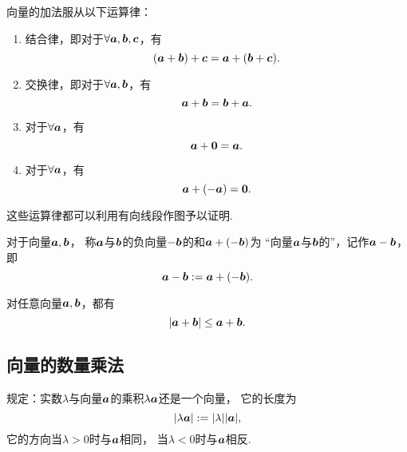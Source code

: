 向量的加法服从以下运算律：
\begin{enumerate}
	\item 结合律，即对于\(\forall \boldsymbol{a},\boldsymbol{b},\boldsymbol{c}\)，有\begin{equation*}
		(\boldsymbol{a}+\boldsymbol{b})+\boldsymbol{c}
		= \boldsymbol{a}+(\boldsymbol{b}+\boldsymbol{c}).
	\end{equation*}

	\item 交换律，即对于\(\forall \boldsymbol{a},\boldsymbol{b}\)，有\begin{equation*}
		\boldsymbol{a}+\boldsymbol{b} = \boldsymbol{b}+\boldsymbol{a}.
	\end{equation*}

	\item 对于\(\forall \boldsymbol{a}\)，有\begin{equation*}
		\boldsymbol{a}+\boldsymbol{0}=\boldsymbol{a}.
	\end{equation*}

	\item 对于\(\forall \boldsymbol{a}\)，有\begin{equation*}
		\boldsymbol{a}+(-\boldsymbol{a})=\boldsymbol{0}.
	\end{equation*}
\end{enumerate}
这些运算律都可以利用有向线段作图予以证明.

\begin{definition}
对于向量\(\boldsymbol{a},\boldsymbol{b}\)，
称\(\boldsymbol{a}\)与\(\boldsymbol{b}\)的负向量\(-\boldsymbol{b}\)的和\(\boldsymbol{a}+(-\boldsymbol{b})\)为
“向量\(\boldsymbol{a}\)与\(\boldsymbol{b}\)的”，记作\(\boldsymbol{a}-\boldsymbol{b}\)，即\begin{equation*}
	\boldsymbol{a}-\boldsymbol{b}
	:=
	\boldsymbol{a}+(-\boldsymbol{b}).
\end{equation*}
\end{definition}

\begin{theorem}
对任意向量\(\boldsymbol{a},\boldsymbol{b}\)，都有\begin{equation*}
	\abs{\boldsymbol{a}+\boldsymbol{b}} \leq \boldsymbol{a} + \boldsymbol{b}.
\end{equation*}
\end{theorem}

\subsection{向量的数量乘法}
\begin{definition}
规定：实数\(\lambda\)与向量\(\boldsymbol{a}\)的乘积\(\lambda \boldsymbol{a}\)还是一个向量，
它的长度为\begin{equation*}
\abs{\lambda\boldsymbol{a}}
:=
\abs{\lambda} \abs{\boldsymbol{a}},
\end{equation*}
它的方向当\(\lambda>0\)时与\(\boldsymbol{a}\)相同，
当\(\lambda<0\)时与\(\boldsymbol{a}\)相反.
\end{definition}

